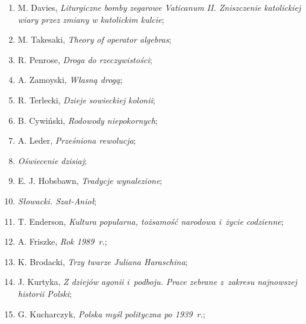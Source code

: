 \documentclass[a4paper,11pt]{article}
\begin{document}
\begin{enumerate}
\item M. Davies, \textit{Liturgiczne bomby zegarowe Vaticanum II.
    Zniszczenie katolickiej wiary przez zmiany w katolickim kulcie};



\item M. Takesaki, \textit{Theory of operator algebras};



\item R. Penrose, \textit{Droga do rzeczywistości};



\item A. Zamoyski, \textit{Własną drogą};



\item R. Terlecki, \textit{Dzieje sowieckiej kolonii};



\item B. Cywiński, \textit{Rodowody niepokornych};



\item A. Leder, \textit{Prześniona rewolucja};



\item \textit{Oświecenie dzisiaj};



\item E. J. Hobsbawn, \textit{Tradycje wynalezione};



\item \textit{Słowacki. Szat-Anioł};



\item T. Enderson, \textit{Kultura popularna, tożsamość narodowa i~życie
    codzienne};



\item A. Friszke, \textit{Rok 1989~r.};



\item K. Brodacki, \textit{Trzy twarze Juliana Haraschina};



\item J. Kurtyka, \textit{Z dziejów agonii i~podboju. Prace zebrane
    z~zakresu najnowszej historii Polski};



\item G. Kucharczyk, \textit{Polska myśl polityczna po 1939~r.};




\end{enumerate}
\end{document}
